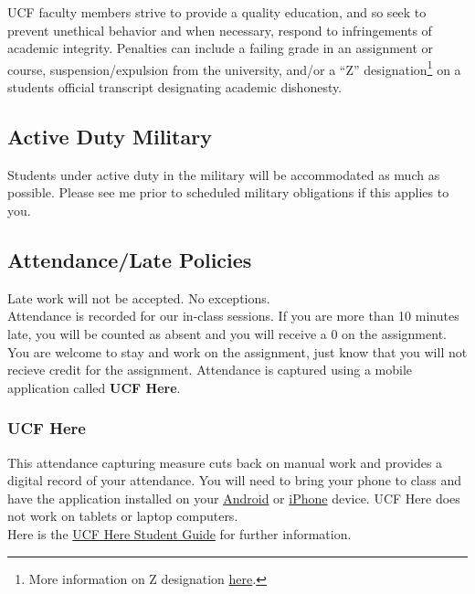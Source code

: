 \documentclass[11pt]{paper}
\begin{document}
UCF faculty members strive to provide a quality education, and so seek to prevent unethical behavior and when necessary, respond to infringements of academic integrity. Penalties can include a failing grade in an assignment or course, suspension/expulsion from the university, and/or a ``Z'' designation\footnote{More information on Z designation \href{https://goldenrule.sdes.ucf.edu/zgrade}{here}.} on a students official transcript designating academic dishonesty. 

\subsection{Active Duty Military}
Students under active duty in the military will be accommodated as much as possible. Please see me  prior to scheduled military obligations if this applies to you.

\subsection{Attendance/Late Policies}

Late work will not be accepted. No exceptions.\\

Attendance is recorded for our in-class sessions. If you are more than 10 minutes late, you will be counted as absent and you will receive a 0 on the assignment. You are welcome to stay and work on the assignment, just know that you will not recieve credit for the assignment. Attendance is captured using a mobile application called \textbf{UCF Here}.

\subsubsection{UCF Here} \label{sec:ucfhere}

This attendance capturing measure cuts back on manual work and provides a digital record of your attendance. You will need to bring your phone to class and have the application installed on your \href{https://play.google.com/store/apps/details?id=edu.ucf.ucfhere&hl=en_US}{Android} or \href{https://itunes.apple.com/us/app/ucf-here/id1450015124}{iPhone} device. UCF Here does not work on tablets or laptop computers.\\

Here is the \href{https://ucf.service-now.com/kb_view.do?sysparm_article=KB0013581}{UCF Here Student Guide} for further information.
\end{document}
